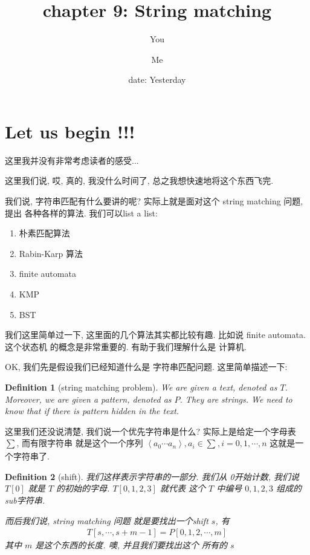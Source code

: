 \documentclass[a4paper, 10pt]{ctexart} %
\title{chapter 9: String matching}
\author{You \and Me}
\date{date: Yesterday}
\newtheorem{definition}{Definition}
\begin{document}
\maketitle
\tableofcontents
\newpage

\section{Let us begin !!!}
这里我并没有非常考虑读者的感受...

这里我们说, 哎, 真的, 我没什么时间了, 
总之我想快速地将这个东西飞完. 

我们说, 字符串匹配有什么要讲的呢? 
实际上就是面对这个 string matching 问题, 提出
各种各样的算法.
我们可以list a list: 
\begin{enumerate}
    \item 朴素匹配算法
    \item Rabin-Karp 算法
    \item finite automata 
    \item KMP 
    \item BST
\end{enumerate}

我们这里简单过一下, 
这里面的几个算法其实都比较有趣.
比如说 finite automata. 这个状态机
的概念是非常重要的. 有助于我们理解什么是
计算机. 

OK, 我们先是假设我们已经知道什么是
字符串匹配问题. 这里简单描述一下:
\begin{definition}[string matching problem]
We are given a text, denoted as $T$. Moreover, 
we are given a pattern, denoted as $P$. 
They are strings. We need to know that 
if there is pattern hidden in 
the text. 
\end{definition}
这里我们还没说清楚, 我们说一个优先字符串是什么? 
实际上是给定一个字母表 $\sum $, 而有限字符串
就是这个一个序列 $\left<a_{0}\cdots a_{n}\right> , a_{i} \in \sum_{}, i =0 , 1, \cdots , n$ 
这就是一个字符串了.
\begin{definition}[shift]
我们这样表示字符串的一部分. 我们从
0开始计数, 我们说 $T\left[ 0 \right]$ 
就是 $T$ 的初始的字母. $T\left[ 0 , 1, 2 ,3 \right]$ 就代表
这个 $T$ 中编号 $0 , 1, 2 , 3$ 组成的sub字符串.

而后我们说, string matching 问题
就是要找出一个shift $s$, 有 
\begin{align*}
    T[s,\cdots , s+m-1] = P[0,1,2,\cdots ,m]
\end{align*}
其中 $m$ 是这个东西的长度. 噢, 并且我们要找出这个
所有的 $s$
\end{definition}
\end{document}
